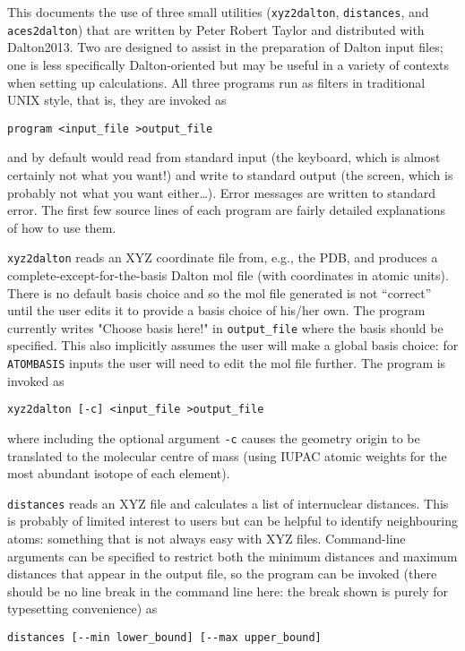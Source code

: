 This documents the use of three small utilities (\verb|xyz2dalton|,
\verb|distances|, and \verb|aces2dalton|) that are written by
Peter Robert Taylor and distributed with
Dalton2013.  Two are designed to assist in the preparation of Dalton
input files; one is less specifically Dalton-oriented but may be
useful in a variety of 
contexts when setting up calculations.  All three programs run as
filters in traditional UNIX style, that is, they are invoked as

\noindent
\verb|program <input_file >output_file|

\noindent
and by default would read from standard input (the keyboard, which is
almost certainly not what you want!) and write to standard output (the
screen, which is probably not what you want either\ldots).  Error
messages are written to standard error.  The 
first few source lines of each program are fairly detailed explanations of
how to use them.  

\verb|xyz2dalton| reads an XYZ coordinate file from, e.g., the PDB,
and produces a complete-except-for-the-basis 
Dalton mol file (with coordinates in atomic units).  There is no
default basis choice and so the mol file generated is not ``correct''
until the user edits it to provide a basis choice of his/her own.
The program currently writes "Choose basis here!" in \verb|output_file|
where the basis should be specified.  This also implicitly assumes the
user will make a global basis choice: for \verb|ATOMBASIS| inputs the
user will need to edit the mol file further.  The program is invoked
as

\noindent
\verb|xyz2dalton [-c] <input_file >output_file|

\noindent
where including the optional argument \verb|-c| causes the geometry
origin to be translated to the molecular centre of mass (using IUPAC
atomic weights for the most abundant isotope of each element).

\verb|distances| reads an XYZ file and calculates a list of
internuclear distances. 
This is probably of limited interest to users but can be helpful to
identify neighbouring atoms: something that is not always easy with
XYZ files.  Command-line arguments can be specified to restrict both the
minimum distances and maximum distances that appear in the output
file, so the program can be invoked (there should be no line break in
the command line here: the break shown is purely for typesetting
convenience) as 

\noindent
\verb|distances [--min lower_bound] [--max upper_bound]|

